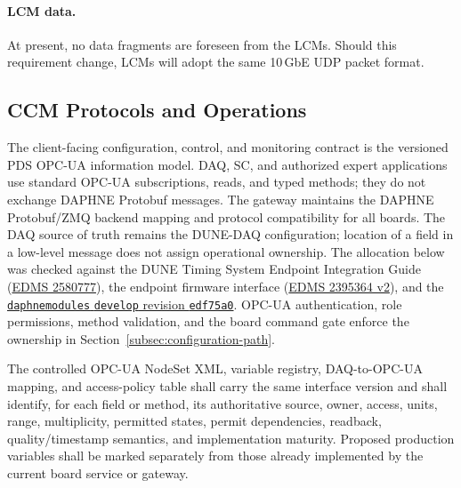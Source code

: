 \paragraph{LCM data.}
At present, no data fragments are foreseen from the LCMs. Should this requirement change,
LCMs will adopt the same 10\,GbE UDP packet format.


\subsection{CCM Protocols and Operations}

The client-facing configuration, control, and monitoring contract is the versioned PDS OPC-UA information model. DAQ, SC, and authorized expert applications use standard OPC-UA subscriptions, reads, and typed methods; they do not exchange DAPHNE Protobuf messages. The gateway maintains the DAPHNE Protobuf/ZMQ backend mapping and protocol compatibility for all boards. The DAQ source of truth remains the DUNE-DAQ configuration; location of a field in a low-level message does not assign operational ownership. The allocation below was checked against the DUNE Timing System Endpoint Integration Guide (\href{https://edms.cern.ch/document/2580777}{EDMS 2580777}), the endpoint firmware interface (\href{https://edms.cern.ch/document/2395364}{EDMS 2395364 v2}), and the \href{https://github.com/DUNE-DAQ/daphnemodules/tree/edf75a0c5f37cb6d1ef889723359e23e746ffe2b}{\texttt{daphnemodules} \texttt{develop} revision \texttt{edf75a0}}. OPC-UA authentication, role permissions, method validation, and the board command gate enforce the ownership in Section~\ref{subsec:configuration-path}.

The controlled OPC-UA NodeSet XML, variable registry, DAQ-to-OPC-UA mapping, and access-policy table shall carry the same interface version and shall identify, for each field or method, its authoritative source, owner, access, units, range, multiplicity, permitted states, permit dependencies, readback, quality/timestamp semantics, and implementation maturity. Proposed production variables shall be marked separately from those already implemented by the current board service or gateway.


